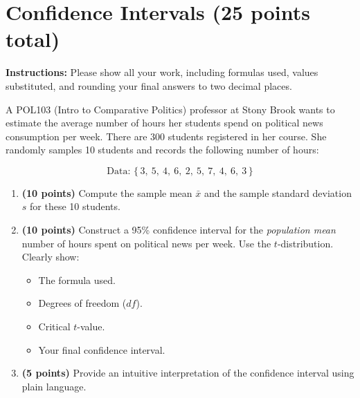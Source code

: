 \documentclass{article}
\newcommand{\blankbox}[2][3cm]{%
    \vspace{-0.5em}
    \begin{figure}[H]
        \makebox[\linewidth]{%
            \begin{tcolorbox}[
                colback=white,
                colframe=white,  %
                width=#2, %
                height=#1,
                boxrule=0.2mm
            ]
            \end{tcolorbox}
        }
    \end{figure}
    \vspace{-2em}
}
\begin{document}
\newpage

\section{Confidence Intervals (25 points total)}
\noindent\textbf{Instructions:} Please show all your work, including formulas used, values substituted, and rounding your final answers to two decimal places.

\bigskip
\noindent A POL103 (Intro to Comparative Politics) professor at Stony Brook wants to estimate the average number of hours her students spend on political news consumption per week. There are 300 students registered in her course. She randomly samples 10 students and records the following number of hours:

\[
\text{Data: } \{\, 3,\ 5,\ 4,\ 6,\ 2,\ 5,\ 7,\ 4,\ 6,\ 3 \,\}
\]

\begin{enumerate}
    \item \textbf{(10 points)}  Compute the sample mean $\bar{x}$ and the sample standard deviation $s$ for these 10 students. \blankbox[3cm]{1.0\linewidth}

    \item \textbf{(10 points)}   Construct a 95\% confidence interval for the \emph{population mean} number of hours spent on political news per week. Use the $t$-distribution. Clearly show:
    \begin{itemize}
        \item The formula used.
        \item Degrees of freedom ($df$).
        \item Critical $t$-value.
        \item Your final confidence interval.
    \end{itemize}
    \blankbox[8.5cm]{1.0\linewidth}

    \item \textbf{(5 points)}   Provide an intuitive interpretation of the confidence interval using plain language.
\end{enumerate}


\end{document}
